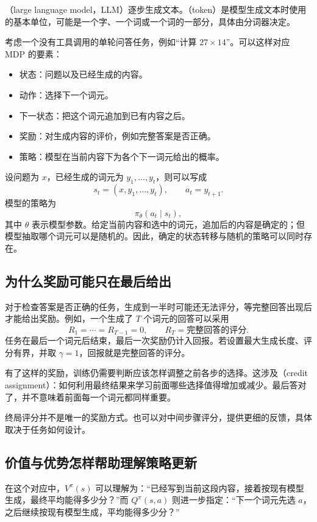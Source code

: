 \documentclass[UTF8]{ctexart}
\begin{document}
（large language model，LLM）逐步生成文本。（token）是模型生成文本时使用的基本单位，可能是一个字、一个词或一个词的一部分，具体由分词器决定。

考虑一个没有工具调用的单轮问答任务，例如“计算 $27\times14$”。可以这样对应 MDP 的要素：
\begin{itemize}
  \item 状态：问题以及已经生成的内容。
  \item 动作：选择下一个词元。
  \item 下一状态：把这个词元追加到已有内容之后。
  \item 奖励：对生成内容的评价，例如完整答案是否正确。
  \item 策略：模型在当前内容下为各个下一词元给出的概率。
\end{itemize}

设问题为 $x$，已经生成的词元为 $y_1,\ldots,y_t$，则可以写成
\[
  s_t=(x,y_1,\ldots,y_t),\qquad a_t=y_{t+1}.
\]
模型的策略为
\[
  \pi_\theta(a_t\mid s_t),
\]
其中 $\theta$ 表示模型参数。给定当前内容和选中的词元，追加后的内容是确定的；但模型抽取哪个词元可以是随机的。因此，确定的状态转移与随机的策略可以同时存在。

\subsection{为什么奖励可能只在最后给出}

对于检查答案是否正确的任务，生成到一半时可能还无法评分，等完整回答出现后才能给出奖励。例如，一个生成了 $T$ 个词元的回答可以采用
\[
  R_1=\cdots=R_{T-1}=0,
  \qquad R_T=\text{完整回答的评分}.
\]
任务在最后一个词元后结束，最后一次奖励仍计入回报。若设置最大生成长度、评分有界，并取 $\gamma=1$，回报就是完整回答的评分。

有了这样的奖励，训练仍需要判断应该怎样调整之前各步的选择。这涉及（credit assignment）：如何利用最终结果来学习前面哪些选择值得增加或减少。最后答对了，并不意味着前面每一个词元都同样重要。

终局评分并不是唯一的奖励方式。也可以对中间步骤评分，提供更细的反馈，具体取决于任务如何设计。

\subsection{价值与优势怎样帮助理解策略更新}

在这个对应中，$V^\pi(s)$ 可以理解为：“已经写到当前这段内容，接着按现有模型生成，最终平均能得多少分？”而 $Q^\pi(s,a)$ 则进一步指定：“下一个词元先选 $a$，之后继续按现有模型生成，平均能得多少分？”
\end{document}
